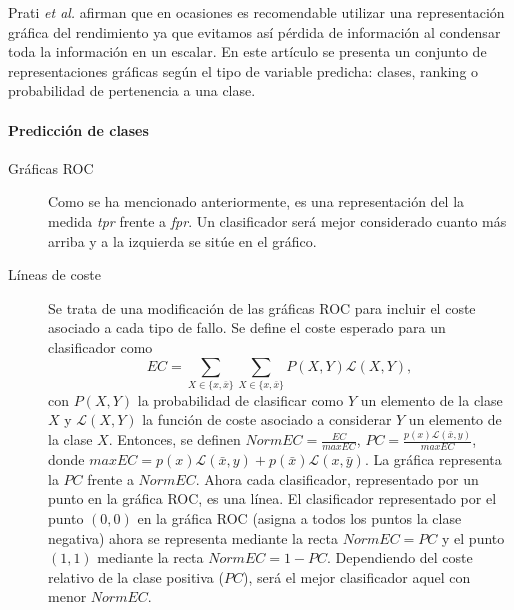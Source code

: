 	Prati \textit{et al.} \cite{DBLP:journals/tkde/PratiBM11} afirman que en ocasiones es 
recomendable utilizar una representación gráfica del 
rendimiento ya que evitamos así pérdida de información al 
condensar toda la información en un escalar. En este artículo 
se presenta un conjunto de representaciones gráficas según el 
tipo de variable predicha: clases, ranking o probabilidad de 
pertenencia a una clase.
	
\paragraph{Predicción de clases}
	\begin{description}
		\item[Gráficas ROC] Como se ha mencionado 
		anteriormente, es una representación del la medida 
		\textit{tpr} frente a \textit{fpr}. Un clasificador 
		será mejor considerado cuanto más arriba y a la 
		izquierda se sitúe en el gráfico. 
		\item[Líneas de coste] Se trata de una modificación 
		de las gráficas ROC para incluir el coste asociado a 
		cada tipo de fallo. Se define el coste esperado para 
		un clasificador como 
		\[ EC = \sum\limits_{X \in \{x, \bar{x}\}} 
		 		\sum\limits_{X \in \{x, \bar{x}\}} 
		 			P(X,Y) \mathcal{L}(X,Y),
		 \]
con $P(X,Y)$ la probabilidad de clasificar como $Y$ un
elemento de la clase $X$ y $\mathcal{L}(X,Y)$ la
función de coste asociado a considerar $Y$ un elemento
de la clase $X$.
Entonces, se definen $NormEC = \frac{EC}{maxEC}$, $PC = 
\frac{p(x) \mathcal{L}(\bar{x},y)}{maxEC}$, donde $maxEC 
= p(x)\mathcal{L}(\bar{x},y)+p(\bar{x})\mathcal{L}(x,
\bar{y})$.  La gráfica representa la $PC$ frente a 
$NormEC$. Ahora cada clasificador, representado por un 
punto en la gráfica ROC, es una línea. El clasificador 
representado por el punto $(0,0)$ en la gráfica ROC (asigna a 
todos los puntos la clase negativa) ahora se representa 
mediante la recta $NormEC=PC$ y el punto $(1,1)$ mediante la 
recta $NormEC= 1-PC$. Dependiendo del coste relativo de la 
clase positiva ($PC$), será el mejor clasificador aquel con 
menor $NormEC$.
	\end{description}

